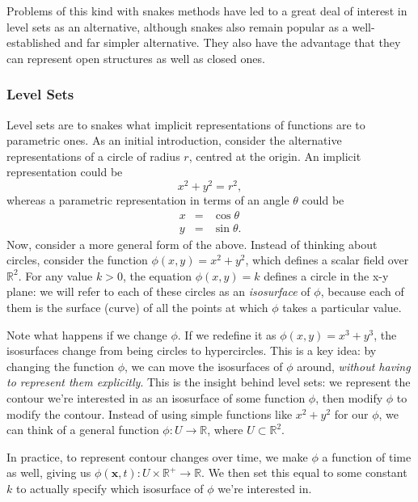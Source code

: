 Problems of this kind with snakes methods have led to a great deal of interest in level sets as an alternative, although snakes also remain popular as a well-established and far simpler alternative. They also have the advantage that they can represent open structures as well as closed ones.

\subsubsection{Level Sets}


Level sets are to snakes what implicit representations of functions are to parametric ones. As an initial introduction, consider the alternative representations of a circle of radius $r$, centred at the origin. An implicit representation could be
%
\[
x^2 + y^2 = r^2,
\]
%
whereas a parametric representation in terms of an angle $\theta$ could be
%
\begin{eqnarray*}
x & = & \cos \theta \\
y & = & \sin \theta.
\end{eqnarray*}
%
Now, consider a more general form of the above. Instead of thinking about circles, consider the function $\phi(x,y) = x^2 + y^2$, which defines a scalar field over $\mathbb{R}^2$. For any value $k > 0$, the equation $\phi(x,y) = k$ defines a circle in the x-y plane: we will refer to each of these circles as an \emph{isosurface} of $\phi$, because each of them is the surface (curve) of all the points at which $\phi$ takes a particular value\footnotemark{}.


Note what happens if we change $\phi$. If we redefine it as $\phi(x,y) = x^3 + y^3$, the isosurfaces change from being circles to hypercircles. This is a key idea: by changing the function $\phi$, we can move the isosurfaces of $\phi$ around, \emph{without having to represent them explicitly}. This is the insight behind level sets: we represent the contour we're interested in as an isosurface of some function $\phi$, then modify $\phi$ to modify the contour. Instead of using simple functions like $x^2 + y^2$ for our $\phi$, we can think of a general function $\phi: U \to \mathbb{R}$, where $U \subset \mathbb{R}^2$.

In practice, to represent contour changes over time, we make $\phi$ a function of time as well, giving us $\phi(\mathbf{x},t): U \times \mathbb{R}^+ \to \mathbb{R}$. We then set this equal to some constant $k$ to actually specify which isosurface of $\phi$ we're interested in.

